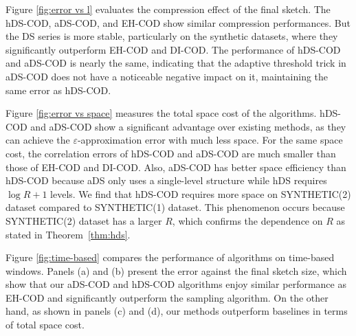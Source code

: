 Figure \ref{fig:error vs l} evaluates the compression effect of the final sketch. The hDS-COD, aDS-COD, and EH-COD show similar compression performances. But the DS series is more stable, particularly on the synthetic datasets, where they significantly outperform EH-COD and DI-COD. The performance of hDS-COD and aDS-COD is nearly the same, indicating that the adaptive threshold trick in aDS-COD does not have a noticeable negative impact on it, maintaining the same error as hDS-COD.

Figure \ref{fig:error vs space} measures the total space cost of the algorithms. hDS-COD and aDS-COD show a significant advantage over existing methods, as they can achieve the  $\varepsilon$-approximation error with much less space. For the same space cost, the correlation errors of hDS-COD and aDS-COD are much smaller than those of EH-COD and DI-COD. Also, aDS-COD has better space efficiency than hDS-COD because aDS only uses a single-level structure while hDS requires $\log R+1$ levels. We find that hDS-COD requires more space on  SYNTHETIC(2) dataset compared to SYNTHETIC(1) dataset. This phenomenon occurs because SYNTHETIC(2) dataset has a larger $R$, which confirms the dependence on $R$ as stated in Theorem~\ref{thm:hds}. 

Figure \ref{fig:time-based} compares the performance of algorithms on time-based windows. Panels (a) and (b) present the error against the final sketch size, which show that our aDS-COD and hDS-COD algorithms enjoy similar performance as EH-COD and significantly outperform the sampling algorithm. On the other hand, as shown in panels (c) and (d), our methods outperform baselines in terms of total space cost.
